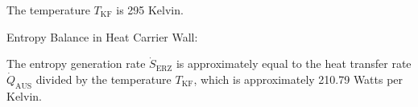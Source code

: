 The temperature \( T_{\text{KF}} \) is 295 Kelvin.

Entropy Balance in Heat Carrier Wall:

The entropy generation rate \( \dot{S}_{\text{ERZ}} \) is approximately equal to the heat transfer rate \( \dot{Q}_{\text{AUS}} \) divided by the temperature \( T_{\text{KF}} \), which is approximately 210.79 Watts per Kelvin.